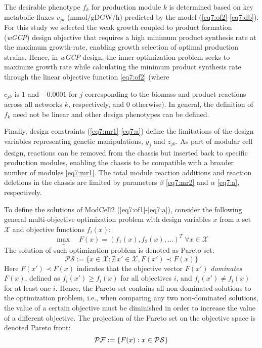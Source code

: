 The desirable phenotype $f_k$ for production module $k$ is determined based on key metabolic fluxes $v_{jk}$ (mmol/gDCW/h) predicted by the model (\ref{eq7:of2}-\ref{eq7:db}).
For this study we selected the weak growth coupled to product formation (\emph{wGCP}) design objective that requires a high minimum product synthesis rate at the maximum growth-rate, enabling growth selection of optimal production strains.
Hence, in \emph{wGCP} design, the inner optimization problem seeks to maximize growth rate while calculating the minimum product synthesis rate through the linear objective function \eqref{eq7:of2} (where {$c_{jk}$ is $1$ and $-0.0001$ for $j$ corresponding to the biomass and product reactions across all networks $k$, respectively, and 0 otherwise).
In general, the definition of $f_k$ need not be linear and other design phenotypes can be defined.\citep{garcia2019}

Finally, design constraints (\ref{eq7:mr1}-\ref{eq7:a}) define the limitations of the design variables representing genetic manipulations, $y_j$ and $z_{jk}$.
As part of modular cell design, reactions can be removed from the chassis but inserted back to specific production modules, enabling the chassis to be compatible with a broader number of modules \eqref{eq7:mr1}.
The total module reaction additions and reaction deletions in the chassis are limited by parameters $\beta$ \eqref{eq7:mr2} and $\alpha$ \eqref{eq7:a}, respectively.%

To define the solutions of ModCell2 (\ref{eq7:of1}-\ref{eq7:a}), consider the following general multi-objective optimization problem with design variables $x$ from a set $\mathcal{X}$ and objective functions $f_i(x)$:
\begin{equation*}
    \underset{ \;x}{\max} \quad F(x) = (f_1(x), f_2(x), \ldots)^T \; \forall x \in \mathcal{X}
\end{equation*}
The solution of such optimization problem is denoted as Pareto set:
\begin{equation*}
    \mathcal{PS}:=\{x \in \mathcal{X}:\nexists \, x' \in \mathcal{X}, F(x') \prec F(x)\} \label{eq7:ps}
\end{equation*}
Here $F(x') \prec F(x)$ indicates that the objective vector $F(x')$ \emph{dominates} $F(x)$, defined as $f_i(x') \ge f_i(x)$ for all objectives $i$, and $f_i(x') \ne f_i(x)$ for at least one $i$. Hence, the Pareto set contains all non-dominated solutions to the optimization problem, i.e., when comparing any two non-dominated solutions, the value of a certain objective must be diminished in order to increase the value of a different objective. The projection of the Pareto set on the objective space is denoted Pareto front:
\begin{equation*}
    \mathcal{PF}:=\{F(x): x \in \mathcal{PS} \}
\end{equation*}

}
